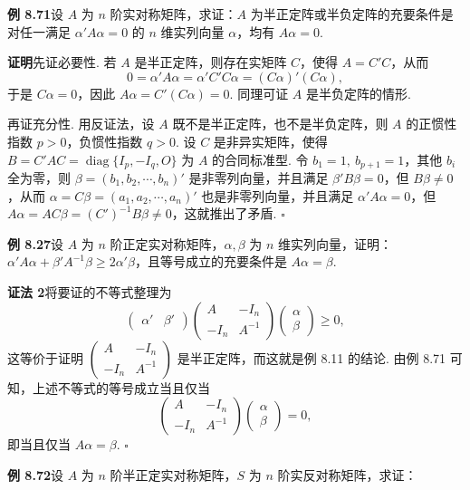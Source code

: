 \documentclass[UTF8,12pt,a4paper,fontset=fandol]{ctexart}
\begin{document}
\noindent\textbf{例 8.71}\quad 设 $A$ 为 $n$ 阶实对称矩阵，求证：$A$ 为半正定阵或半负定阵的充要条件是对任一满足 $\alpha'A\alpha=0$ 的 $n$ 维实列向量 $\alpha$，均有 $A\alpha=0$.

\noindent\textbf{证明}\quad 先证必要性. 若 $A$ 是半正定阵，则存在实矩阵 $C$，使得 $A=C'C$，从而
\[
0=\alpha'A\alpha=\alpha'C'C\alpha=(C\alpha)'(C\alpha),
\]
于是 $C\alpha=0$，因此 $A\alpha=C'(C\alpha)=0$. 同理可证 $A$ 是半负定阵的情形.

再证充分性. 用反证法，设 $A$ 既不是半正定阵，也不是半负定阵，则 $A$ 的正惯性指数 $p>0$，负惯性指数 $q>0$. 设 $C$ 是非异实矩阵，使得 $B=C'AC=\operatorname{diag}\{I_p,-I_q,O\}$ 为 $A$ 的合同标准型. 令 $b_1=1,\ b_{p+1}=1$，其他 $b_i$ 全为零，则 $\beta=(b_1,b_2,\cdots,b_n)'$ 是非零列向量，并且满足 $\beta'B\beta=0$，但 $B\beta\ne 0$，从而 $\alpha=C\beta=(a_1,a_2,\cdots,a_n)'$ 也是非零列向量，并且满足 $\alpha'A\alpha=0$，但 $A\alpha=AC\beta=(C')^{-1}B\beta\ne 0$，这就推出了矛盾. $\ensuremath{\square}$

\noindent\textbf{例 8.27}\quad 设 $A$ 为 $n$ 阶正定实对称矩阵，$\alpha,\beta$ 为 $n$ 维实列向量，证明：$\alpha'A\alpha+\beta'A^{-1}\beta\ge 2\alpha'\beta$，且等号成立的充要条件是 $A\alpha=\beta$.

\noindent\textbf{证法 2}\quad 将要证的不等式整理为
\[
\left(\begin{array}{cc}\alpha'&\beta'\end{array}\right)
\left(\begin{array}{cc}
A & -I_n\\
-I_n & A^{-1}
\end{array}\right)
\left(\begin{array}{c}
\alpha\\
\beta
\end{array}\right)\ge 0,
\]
这等价于证明 $\left(\begin{array}{cc}A&-I_n\\ -I_n&A^{-1}\end{array}\right)$ 是半正定阵，而这就是例 8.11 的结论. 由例 8.71 可知，上述不等式的等号成立当且仅当
\[
\left(\begin{array}{cc}
A & -I_n\\
-I_n & A^{-1}
\end{array}\right)
\left(\begin{array}{c}
\alpha\\
\beta
\end{array}\right)=0,
\]
即当且仅当 $A\alpha=\beta$. $\ensuremath{\square}$

\noindent\textbf{例 8.72}\quad 设 $A$ 为 $n$ 阶半正定实对称矩阵，$S$ 为 $n$ 阶实反对称矩阵，求证：
\end{document}
